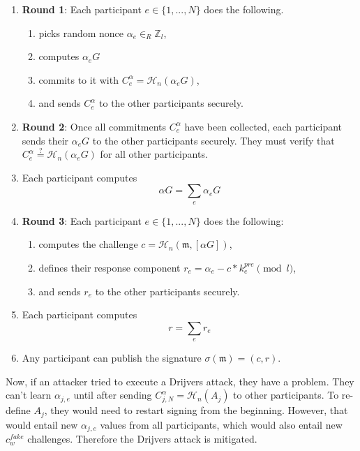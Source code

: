 \begin{enumerate}
    \item \textbf{Round 1}: Each participant $e \in \{1,...,N\}$ does the following.
    \begin{enumerate}
        \item picks random nonce $\alpha_e \in_R \mathbb{Z}_l$,
        \item computes $\alpha_e G$
        \item commits to it with $C^{\alpha}_e = \mathcal{H}_n(\alpha_e G)$,
        \item and sends $C^{\alpha}_e$ to the other participants securely.
    \end{enumerate}

    \item \textbf{Round 2}: Once all commitments $C^{\alpha}_e$ have been collected, each participant sends their $\alpha_e G$ to the other participants securely. They must verify that $C^{\alpha}_e \stackrel{?}{=} \mathcal{H}_n(\alpha_e G)$ for all other participants.

    \item Each participant computes 
    \[ \alpha G = \sum_e \alpha_e G \]

    \item \textbf{Round 3}: Each participant $e \in \{1,...,N\}$ does the following:
    \begin{enumerate}
        \item computes the challenge $c = \mathcal{H}_n(\mathfrak{m},[\alpha G])$,
        \item defines their response component $r_e = \alpha_e - c*k^{pre}_e \pmod l$,
        \item and sends $r_e$ to the other participants securely.
    \end{enumerate}
    \item Each participant computes 
    \[ r = \sum_e r_e\]
    \item Any participant can publish the signature $\sigma(\mathfrak{m}) = (c,r)$.
\end{enumerate}

Now, if an attacker tried to execute a Drijvers attack, they have a problem. They can't learn $\alpha_{j,e}$ until after sending $C^{\alpha}_{j,N} = \mathcal{H}_n(A_j)$ to other participants. To re-define $A_j$, they would need to restart signing from the beginning. However, that would entail new $\alpha_{j,e}$ values from all participants, which would also entail new $c^{fake}_w$ challenges. Therefore the Drijvers attack is mitigated.


